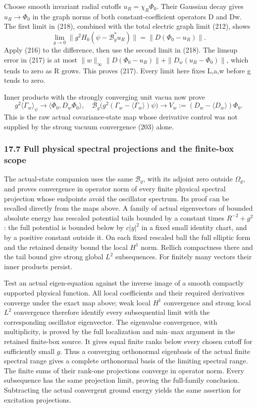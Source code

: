 \documentclass[
  11pt,
]{article}
\begin{document}
Choose smooth invariant radial cutoffs \(u_R=\chi_R\Phi_0\). Their
Gaussian decay gives \(u_R\to\Phi_0\) in the graph norms of both
constant-coefficient operators D and Dw. The first limit in (218),
combined with the total electric graph limit (212), shows \[
 \lim_{g\to0}\|g^2H_0(\psi-\mathcal B_g^*u_R)\|
        =\|D(\Phi_0-u_R)\|.                                \tag{219}
\] Apply (216) to the difference, then use the second limit in (218).
The limsup error in (217) is at most \(\|w\|_\infty\|D(\Phi_0-u_R)\|+
\|D_w(u_R-\Phi_0)\|\), which tends to zero as R grows. This proves
(217). Every limit here fixes L,a,w before g tends to zero.

Inner products with the strongly converging unit vacua now prove \[
 g^2\langle\Gamma_w\rangle_\psi\to
          \langle\Phi_0,D_w\Phi_0\rangle,
\quad
 \mathcal B_g\bigl(g^2(\Gamma_w-\langle\Gamma_w\rangle)\psi\bigr)
     \to V_w:=(D_w-\langle D_w\rangle)\Phi_0.              \tag{220}
\] This is the raw actual covariance-state map whose derivative control
was not supplied by the strong vacuum convergence (203) alone.

\subsubsection{17.7 Full physical spectral projections and the
finite-box
scope}\label{full-physical-spectral-projections-and-the-finite-box-scope}

The actual-state companion uses the same \(\mathcal B_g\), with its
adjoint zero outside \(\Omega_g\), and proves convergence in operator
norm of every finite physical spectral projection whose endpoints avoid
the oscillator spectrum. Its proof can be recalled directly from the
maps above. A family of actual eigenvectors of bounded absolute energy
has rescaled potential tails bounded by a constant times \(R^{-2}+g^2\):
the full potential is bounded below by \(c|y|^2\) in a fixed small
identity chart, and by a positive constant outside it. On each fixed
rescaled ball the full elliptic form and the retained density bound the
local \(H^1\) norm. Rellich compactness there and the tail bound give
strong global \(L^2\) subsequences. For finitely many vectors their
inner products persist.

Test an actual eigen-equation against the inverse image of a smooth
compactly supported physical function. All local coefficients and their
required derivatives converge under the exact map above; weak local
\(H^1\) convergence and strong local \(L^2\) convergence therefore
identify every subsequential limit with the corresponding oscillator
eigenvector. The eigenvalue convergence, with multiplicity, is proved by
the full localization and min--max argument in the retained finite-box
source. It gives equal finite ranks below every chosen cutoff for
sufficiently small \(g\). Thus a converging orthonormal eigenbasis of
the actual finite spectral range gives a complete orthonormal basis of
the limiting spectral range. The finite sums of their rank-one
projections converge in operator norm. Every subsequence has the same
projection limit, proving the full-family conclusion. Subtracting the
actual convergent ground energy yields the same assertion for excitation
projections.
\end{document}
